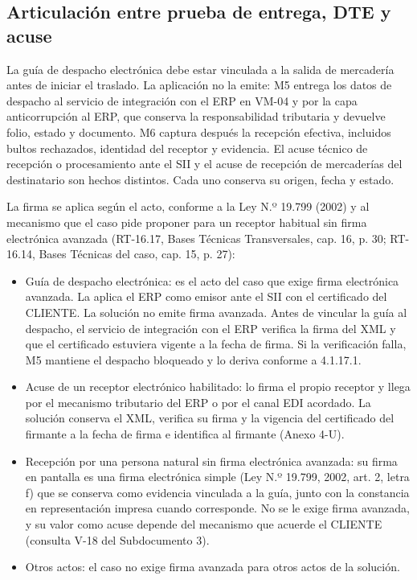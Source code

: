 \subsection{Articulación entre prueba de entrega, DTE y acuse}
\label{sec:pod-dte-acuse}

La guía de despacho electrónica debe estar vinculada a la salida de mercadería antes de iniciar el traslado. La aplicación no la emite: M5 entrega los datos de despacho al servicio de integración con el ERP en VM-04 y por la capa anticorrupción al ERP, que conserva la responsabilidad tributaria y devuelve folio, estado y documento. M6 captura después la recepción efectiva, incluidos bultos rechazados, identidad del receptor y evidencia. El acuse técnico de recepción o procesamiento ante el SII y el acuse de recepción de mercaderías del destinatario son hechos distintos. Cada uno conserva su origen, fecha y estado.

La firma se aplica según el acto, conforme a la Ley N.º 19.799 (2002) y al mecanismo que el caso pide proponer para un receptor habitual sin firma electrónica avanzada (RT-16.17, Bases Técnicas Transversales, cap. 16, p. 30; RT-16.14, Bases Técnicas del caso, cap. 15, p. 27):

\begin{itemize}
  \item Guía de despacho electrónica: es el acto del caso que exige firma electrónica avanzada. La aplica el ERP como emisor ante el SII con el certificado del CLIENTE. La solución no emite firma avanzada. Antes de vincular la guía al despacho, el servicio de integración con el ERP verifica la firma del XML y que el certificado estuviera vigente a la fecha de firma. Si la verificación falla, M5 mantiene el despacho bloqueado y lo deriva conforme a 4.1.17.1.
  \item Acuse de un receptor electrónico habilitado: lo firma el propio receptor y llega por el mecanismo tributario del ERP o por el canal EDI acordado. La solución conserva el XML, verifica su firma y la vigencia del certificado del firmante a la fecha de firma e identifica al firmante (Anexo 4-U).
  \item Recepción por una persona natural sin firma electrónica avanzada: su firma en pantalla es una firma electrónica simple (Ley N.º 19.799, 2002, art. 2, letra f) que se conserva como evidencia vinculada a la guía, junto con la constancia en representación impresa cuando corresponde. No se le exige firma avanzada, y su valor como acuse depende del mecanismo que acuerde el CLIENTE (consulta V-18 del Subdocumento 3).
  \item Otros actos: el caso no exige firma avanzada para otros actos de la solución.
\end{itemize}

